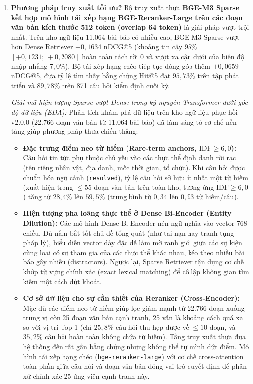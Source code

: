 \begin{enumerate}
  \item[\textbf{Q1:}] \textbf{Phương pháp truy xuất tối ưu?}
  Bộ truy xuất thưa \textbf{BGE-M3 Sparse kết hợp mô hình tái xếp hạng BGE-Reranker-Large trên các đoạn văn bản kích thước 512 token (overlap 64 token)} là giải pháp vượt trội nhất. Trên kho ngữ liệu 11.064 bài báo có nhiễu cao, BGE-M3 Sparse vượt hơn Dense Retriever $+0{,}1634$ nDCG@5 (khoảng tin cậy 95\% $[+0{,}1231;\,+0{,}2080]$ hoàn toàn tách rời 0 và vượt xa cận dưới của biên độ nhập nhằng $7{,}0\%$). Bộ tái xếp hạng chéo tiếp tục đóng góp thêm $+0{,}0659$ nDCG@5, đưa tỷ lệ tìm thấy bằng chứng Hit@5 đạt $95{,}73\%$ trên tập phát triển và $89{,}78\%$ trên 871 câu hỏi kiểm định cuối kỳ.

  \textit{Giải mã hiện tượng Sparse vượt Dense trong kỷ nguyên Transformer dưới góc độ dữ liệu (EDA):}
  Phân tích khám phá dữ liệu trên kho ngữ liệu phục hồi v2.0.0 (22.766 đoạn văn bản từ 11.064 bài báo) đã làm sáng tỏ cơ chế nền tảng giúp phương pháp thưa chiến thắng:
  \begin{itemize}
    \item \textbf{Đặc trưng điểm neo từ hiếm (Rare-term anchors, $\text{IDF} \ge 6{,}0$):} Câu hỏi tin tức phụ thuộc chủ yếu vào các thực thể định danh rời rạc (tên riêng nhân vật, địa danh, mốc thời gian, tổ chức). Khi câu hỏi được chuẩn hóa ngữ cảnh (\texttt{resolved}), tỷ lệ câu hỏi sở hữu ít nhất một từ hiếm (xuất hiện trong $\le 55$ đoạn văn bản trên toàn kho, tương ứng $\text{IDF} \ge 6{,}0$) tăng từ $28{,}4\%$ lên $59{,}5\%$ (trung bình từ $0{,}34$ lên $0{,}93$ từ hiếm/câu).
    \item \textbf{Hiện tượng pha loãng thực thể ở Dense Bi-Encoder (Entity Dilution):} Các mô hình Dense Bi-Encoder nén ngữ nghĩa vào vector 768 chiều. Dù nắm bắt tốt chủ đề tổng quát (như tai nạn hay tranh tụng pháp lý), biểu diễn vector dày đặc dễ làm mờ ranh giới giữa các sự kiện cùng loại có sự tham gia của các thực thể khác nhau, kéo theo nhiều bài báo gây nhiễu (distractors). Ngược lại, Sparse Retriever tận dụng cơ chế khớp từ vựng chính xác (exact lexical matching) để cô lập không gian tìm kiếm một cách dứt khoát.
    \item \textbf{Cơ sở dữ liệu cho sự cần thiết của Reranker (Cross-Encoder):} Mặc dù các điểm neo từ hiếm giúp lọc giảm mạnh từ 22.766 đoạn xuống trung vị còn 25 đoạn văn bản cạnh tranh, 25 vẫn là khoảng cách quá xa so với vị trí Top-1 (chỉ $25{,}8\%$ câu hỏi thu hẹp được về $\le 10$ đoạn, và $35{,}2\%$ câu hỏi hoàn toàn không chứa từ hiếm). Tầng truy xuất thưa đưa hệ thống đến rất gần bằng chứng nhưng không thể tự mình dứt điểm. Mô hình tái xếp hạng chéo (\texttt{bge-reranker-large}) với cơ chế cross-attention toàn phần giữa câu hỏi và đoạn văn bản đóng vai trò quyết định để phân xử chính xác 25 ứng viên cạnh tranh này.

\end{itemize}
\end{enumerate}
